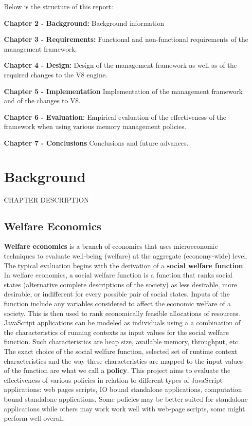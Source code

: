 \documentclass{l4proj}
\begin{document}
Below is the structure of this report:

\textbf{Chapter 2 - Background:}
Background information

\textbf{Chapter 3 - Requirements:}
Functional and non-functional requirements of the management framework.

\textbf{Chapter 4 - Design:}
Design of the management framework as well as of the required changes to the V8 engine.

\textbf{Chapter 5 - Implementation}
Implementation of the management framework and of the changes to V8.

\textbf{Chapter 6 - Evaluation:}
Empirical evaluation of the effectiveness of the framework when using various memory management policies.

\textbf{Chapter 7 - Conclusions}
Conclusions and future advances.


\chapter{Background}
CHAPTER DESCRIPTION
\section{Welfare Economics}
\hspace*{3em} \textbf{Welfare economics} is a branch of economics that uses microeconomic techniques to evaluate well-being (welfare) at the aggregate (economy-wide) level.\cite{welfareeconomics} The typical evaluation begins with the derivation of a \textbf{social welfare function}. In welfare economics, a social welfare function is a function that ranks social states (alternative complete descriptions of the society) as less desirable, more desirable, or indifferent for every possible pair of social states. Inputs of the function include any variables considered to affect the economic welfare of a society.\cite{socialwelfarefunction} This is then used to rank economically feasible allocations of resources. JavaScript applications can be modeled as individuals using a a combination of the characteristics of running contexts as input values for the social welfare function. Such characteristics are heap size, available memory, throughput, etc. The exact choice of the social welfare function, selected set of runtime context characteristics and the way these characteristics are mapped to the input values of the function are what we call a \textbf{policy}. This project aims to evaluate the effectiveness of various policies in relation to different types of JavaScript applications: web pages scripts, IO bound standalone applications, computation bound standalone applications. Some policies may be better suited for standalone applications while others may work work well with web-page scripts, some might perform well overall. 
\end{document}
